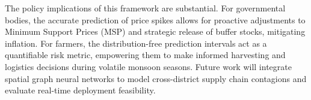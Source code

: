 \documentclass[conference]{IEEEtran}
\begin{document}
The policy implications of this framework are substantial. For governmental bodies, the accurate prediction of price spikes allows for proactive adjustments to Minimum Support Prices (MSP) and strategic release of buffer stocks, mitigating inflation. For farmers, the distribution-free prediction intervals act as a quantifiable risk metric, empowering them to make informed harvesting and logistics decisions during volatile monsoon seasons. Future work will integrate spatial graph neural networks to model cross-district supply chain contagions and evaluate real-time deployment feasibility.



\end{document}
